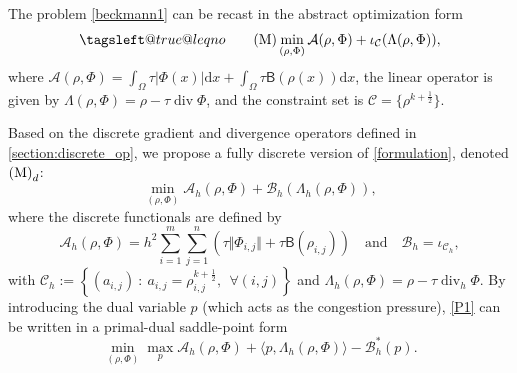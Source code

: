 \documentclass[final,reqno]{amsart}
\makeatletter
\theoremstyle{plain}
\theoremstyle{definition}
\theoremstyle{remark}
\numberwithin{remark}{section}	%
\numberwithin{example}{section}	%
\DeclareMathOperator{\dive}{div}
\newcommand{\Om}{\Omega}
\newcommand{\CC}{\mathcal C}
\newcommand{\A}{\mathcal A}
\newcommand{\B}{\mathcal B}
\newcommand{\M}{\textup{(M)}}
\newcommand{\dd}{\mathrm{d}}
\newcommand{\BB}{\mathsf{B}}
\newcommand{\I}{\iota}
\newcommand{\leqnomode}{\tagsleft@true\let\veqno\@@leqno}
\makeatother
\begin{document}
The problem \eqref{beckmann1} can be recast in the abstract optimization form
\begin{equation}
    \leqnomode
    \tag{M}
    \label{formulation}
    \min_{(\rho,\Phi)} \A(\rho,\Phi) +  \I_{\CC} (\Lambda(\rho,\Phi)),
\end{equation}
where $\A(\rho,\Phi) =\int_\Om \tau\vert\Phi(x)\vert\dd x + \int_{\Om}\tau \BB(\rho(x))\dd x$, the linear operator is given by $\Lambda(\rho,\Phi)  = \rho-\tau\dive\Phi$, and the constraint set is $\CC = \{ \rho^{k+\frac{1}{2}} \}$.

Based on the discrete gradient and divergence operators defined in \cref{section:discrete_op}, we propose a fully discrete version of \eqref{formulation}, denoted $\M_d$:
\begin{equation}
    \label{P1}
    \min_{(\rho,\Phi)} \A_h(\rho,\Phi) + \B_h(\Lambda_h(\rho,\Phi)),
\end{equation}
where the discrete functionals are defined by
\begin{equation}
    \label{eq:functionals_h}
    \A_h(\rho,\Phi) = h^2\sum_{i=1}^{m}\sum_{j=1}^{n}\left( \tau\Vert\Phi_{i,j}\Vert  + \tau\BB(\rho_{i,j}) \right) \quad \mbox{and} \quad \B_h=\I_{\CC_h},
\end{equation}
with $\CC_h:=\left\{ (a_{i,j})\: : \: a_{i,j} = \rho_{i,j}^{k+\frac{1}{2}},~~ \forall (i,j) \right\}$ and $\Lambda_h (\rho,\Phi) = \rho -\tau\dive_h\Phi$.
By introducing the dual variable $p$ (which acts as the congestion pressure), \eqref{P1} can be written in a primal-dual saddle-point form
\begin{equation}
    \label{eq:P1PD}
    \min_{(\rho,\Phi)}\max_{p} \A_h(\rho,\Phi) + \langle p, \Lambda_{h}(\rho,\Phi)\rangle - \B_{h}^{*}(p).
\end{equation}
\end{document}
